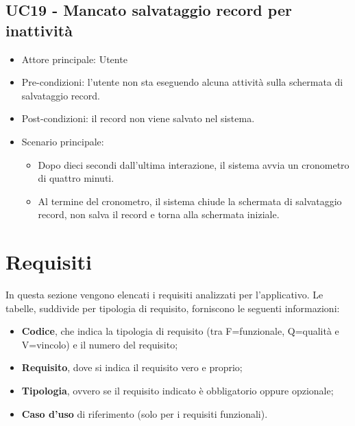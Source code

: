 \subsection{UC19 - Mancato salvataggio record per inattività}
\begin{itemize}
    \item Attore principale: Utente
    \item Pre-condizioni: l'utente non sta eseguendo alcuna attività  sulla schermata di salvataggio record.
    \item Post-condizioni: il record non viene salvato nel sistema.
    \item Scenario principale: \begin{itemize}
        \item Dopo dieci secondi dall'ultima interazione, il sistema avvia un cronometro di quattro minuti.
        \item Al termine del cronometro, il sistema chiude la schermata di salvataggio record, non salva il record e torna alla schermata iniziale.
    \end{itemize}
\end{itemize}
\newpage
\section{Requisiti}
In questa sezione vengono elencati i requisiti analizzati per l'applicativo.
Le tabelle, suddivide per tipologia di requisito, forniscono le seguenti informazioni:
\begin{itemize}
    \item \textbf{Codice}, che indica la tipologia di requisito (tra F=funzionale, Q=qualità e V=vincolo) e il numero del requisito;
    \item \textbf{Requisito}, dove si indica il requisito vero e proprio;
    \item \textbf{Tipologia}, ovvero se il requisito indicato è obbligatorio oppure opzionale;
    \item \textbf{Caso d'uso} di riferimento (solo per i requisiti funzionali).
\end{itemize}
